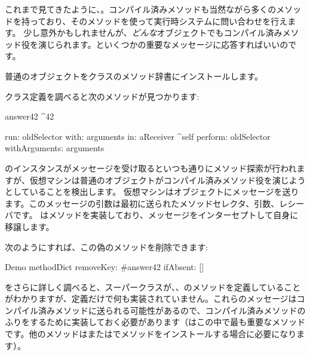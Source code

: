 \documentclass[a4paper,10pt,twoside]{book}
\begin{document}
これまで見てきたように、。コンパイル済みメソッドも当然ながら多くのメソッドを持っており、そのメソッドを使って実行時システムに問い合わせを行えます。
少し意外かもしれませんが、\emph{どんな}オブジェクトでもコンパイル済みメソッド役を演じられます。といくつかの重要なメッセージに応答すればいいのです。


普通のオブジェクトをクラスのメソッド辞書にインストールします。


クラス定義を調べると次のメソッドが見つかります:
\begin{code}{}
answer42
	^42

run: oldSelector with: arguments in: aReceiver
	^self perform: oldSelector withArguments: arguments
\end{code}

のインスタンスがメッセージを受け取るといつも通りにメソッド探索が行われますが、仮想マシンは普通のオブジェクトがコンパイル済みメソッド役を演じようとしていることを検出します。
仮想マシンはオブジェクトにメッセージを送ります。このメッセージの引数は最初に送られたメソッドセレクタ、引数、レシーバです。
はメソッドを実装しており、メッセージをインターセプトして自身に移譲します。

次のようにすれば、この偽のメソッドを削除できます:
\begin{code}{}
Demo methodDict removeKey: #answer42 ifAbsent: []
\end{code}

をさらに詳しく調べると、スーパークラスが、、のメソッドを定義していることがわかりますが、定義だけで何も実装されていません。これらのメッセージはコンパイル済みメソッドに送られる可能性があるので、コンパイル済みメソッドのふりをするために実装しておく必要があります（はこの中で最も重要なメソッドです。他のメソッドはまたはでメソッドをインストールする場合に必要になります）。
\end{document}
